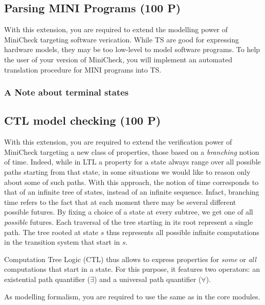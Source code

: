 \documentclass{article}
\begin{document}
\subsection{Parsing MINI Programs (100 P)}
With this extension, you are required to extend the modelling power of MiniCheck targeting 
software verication. While TS are good for expressing hardware models, they may be too low-level 
to model software programs. To help the user of your version of MiniCheck, you will implement an 
automated translation procedure for MINI programs into TS.



\subsubsection*{A Note about terminal states}



\subsection{CTL model checking (100 P)}
With this extension, you are required to extend the verification power of MiniCheck targeting a new class 
of properties, those based on a \emph{branching} notion of time. Indeed, while in LTL a property for a state 
always range over all possible paths starting from that state, in some situations we would like to reason only
about some of such paths. With this approach, the notion of time corresponds to that of an infinite tree of states, 
instead of an infinite sequence. Infact, branching time refers to the fact that at each moment there may be 
several different possible futures. By fixing a choice of a state at every subtree, we get one of all \emph{possible}
futures. Each traversal of the tree starting in its root represent a single path. The tree rooted
at state $s$ thus represents all possible infinite computations in the transition system that
start in $s$.

Computation Tree Logic (CTL) thus allows to express properties for \emph{some} or \emph{all} computations 
that start in a state. For this purpose, it features two operators: an existential path quantifier ($\exists$) 
and a universal path quantifier ($\forall$). 

As modelling formalism, you are required to use the same as in the core modules.
\end{document}

